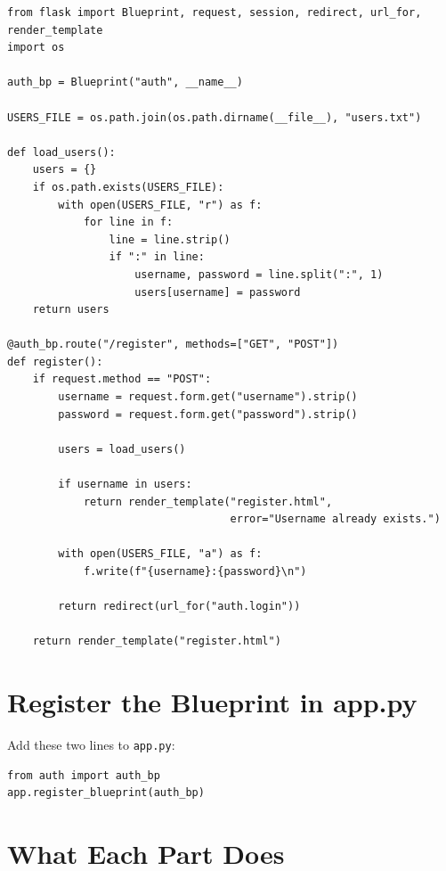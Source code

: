 \documentclass[12pt, a4paper]{article}
\begin{document}
\begin{lstlisting}
from flask import Blueprint, request, session, redirect, url_for, render_template
import os

auth_bp = Blueprint("auth", __name__)

USERS_FILE = os.path.join(os.path.dirname(__file__), "users.txt")

def load_users():
    users = {}
    if os.path.exists(USERS_FILE):
        with open(USERS_FILE, "r") as f:
            for line in f:
                line = line.strip()
                if ":" in line:
                    username, password = line.split(":", 1)
                    users[username] = password
    return users

@auth_bp.route("/register", methods=["GET", "POST"])
def register():
    if request.method == "POST":
        username = request.form.get("username").strip()
        password = request.form.get("password").strip()

        users = load_users()

        if username in users:
            return render_template("register.html",
                                   error="Username already exists.")

        with open(USERS_FILE, "a") as f:
            f.write(f"{username}:{password}\n")

        return redirect(url_for("auth.login"))

    return render_template("register.html")
\end{lstlisting}

\section{Register the Blueprint in app.py}

Add these two lines to \texttt{app.py}:

\begin{lstlisting}
from auth import auth_bp
app.register_blueprint(auth_bp)
\end{lstlisting}

\section{What Each Part Does}
\end{document}
